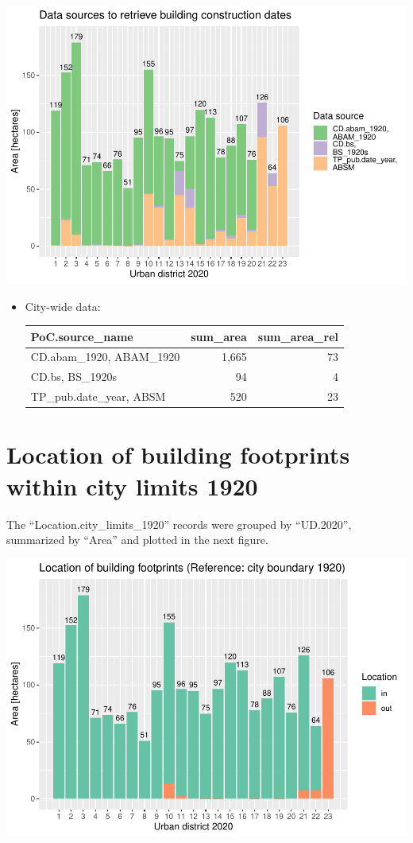 \documentclass[
]{article}
\providecommand{\tightlist}{%
  \setlength{\itemsep}{0pt}\setlength{\parskip}{0pt}}
\begin{document}
\includegraphics{Usage_code_files/figure-latex/unnamed-chunk-9-1.pdf}

\begin{itemize}
\tightlist
\item
  City-wide data:

  \begin{tabular}[t]{l|r|r}
  \hline
  PoC.source\_name & sum\_area & sum\_area\_rel\\
  \hline
  CD.abam\_1920,
  ABAM\_1920 & 1,665 & 73\\
  \hline
  CD.bs,
  BS\_1920s & 94 & 4\\
  \hline
  TP\_pub.date\_year,
  ABSM & 520 & 23\\
  \hline
  \end{tabular}
\end{itemize}

\hypertarget{location-of-building-footprints-within-city-limits-1920}{%
\section{Location of building footprints within city limits
1920}\label{location-of-building-footprints-within-city-limits-1920}}

The ``Location.city\_limits\_1920'' records were grouped by ``UD.2020'',
summarized by ``Area'' and plotted in the next figure.

\includegraphics{Usage_code_files/figure-latex/unnamed-chunk-10-1.pdf}
\end{document}
